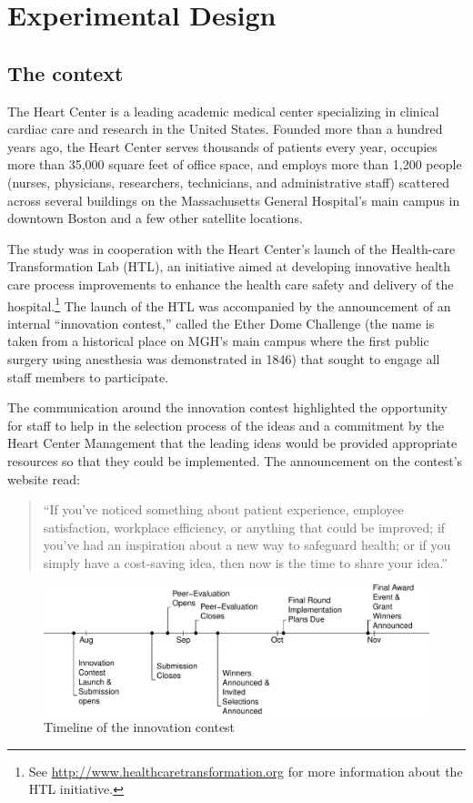 \documentclass[11pt, titlepage]{article}
\begin{document}
\section{Experimental Design}\label{experimental-design}

\subsection{The context}\label{the-context}

The Heart Center is a leading academic medical center specializing in
clinical cardiac care and research in the United States. Founded more
than a hundred years ago, the Heart Center serves thousands of patients
every year, occupies more than 35,000 square feet of office space, and
employs more than 1,200 people (nurses, physicians, researchers,
technicians, and administrative staff) scattered across several
buildings on the Massachusetts General Hospital's main campus in
downtown Boston and a few other satellite locations.

The study was in cooperation with the Heart Center's launch of the
Health-care Transformation Lab (HTL), an initiative aimed at developing
innovative health care process improvements to enhance the health care
safety and delivery of the hospital.\footnote{See
  \url{http://www.healthcaretransformation.org} for more information
  about the HTL initiative.} The launch of the HTL was accompanied by
the announcement of an internal ``innovation contest,'' called the Ether
Dome Challenge (the name is taken from a historical place on MGH's main
campus where the first public surgery using anesthesia was demonstrated
in 1846) that sought to engage all staff members to participate.

The communication around the innovation contest highlighted the
opportunity for staff to help in the selection process of the ideas and
a commitment by the Heart Center Management that the leading ideas would
be provided appropriate resources so that they could be implemented. The
announcement on the contest's website read:

\begin{quote}
``If you've noticed something about patient experience, employee
satisfaction, workplace efficiency, or anything that could be improved;
if you've had an inspiration about a new way to safeguard health; or if
you simply have a cost-saving idea, then now is the time to share your
idea.''
\end{quote}

\begin{figure}
\centering
\includegraphics{Figures/figure_timeline-1.pdf}
\caption{Timeline of the innovation contest\label{timeline}}
\end{figure}
\end{document}
